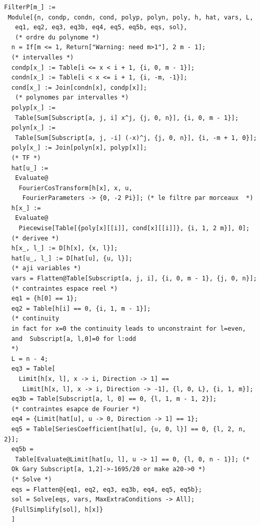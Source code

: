 \documentclass[11pt,twoside]{article}
\begin{document}
\begin{lstlisting}[language=iPython]
FilterP[m_] := 
 Module[{n, condp, condn, cond, polyp, polyn, poly, h, hat, vars, L, 
   eq1, eq2, eq3, eq3b, eq4, eq5, eq5b, eqs, sol},
   (* ordre du polynome *)
  n = If[m <= 1, Return["Warning: need m>1"], 2 m - 1];
  (* intervalles *)
  condp[x_] := Table[i <= x < i + 1, {i, 0, m - 1}];
  condn[x_] := Table[i < x <= i + 1, {i, -m, -1}];
  cond[x_] := Join[condn[x], condp[x]];
   (* polynomes par intervalles *)
  polyp[x_] := 
   Table[Sum[Subscript[a, j, i] x^j, {j, 0, n}], {i, 0, m - 1}];
  polyn[x_] := 
   Table[Sum[Subscript[a, j, -i] (-x)^j, {j, 0, n}], {i, -m + 1, 0}];
  poly[x_] := Join[polyn[x], polyp[x]];
  (* TF *)
  hat[u_] := 
   Evaluate@
    FourierCosTransform[h[x], x, u, 
     FourierParameters -> {0, -2 Pi}]; (* le filtre par morceaux  *)
  h[x_] := 
   Evaluate@
    Piecewise[Table[{poly[x][[i]], cond[x][[i]]}, {i, 1, 2 m}], 0];
  (* derivee *)
  h[x_, l_] := D[h[x], {x, l}];
  hat[u_, l_] := D[hat[u], {u, l}];
  (* aji variables *)
  vars = Flatten@Table[Subscript[a, j, i], {i, 0, m - 1}, {j, 0, n}];
  (* contraintes espace reel *)
  eq1 = {h[0] == 1};
  eq2 = Table[h[i] == 0, {i, 1, m - 1}];
  (* continuity
  in fact for x=0 the continuity leads to unconstraint for l=even, 
  and  Subscript[a, l,0]=0 for l:odd
  *)
  L = n - 4;
  eq3 = Table[
    Limit[h[x, l], x -> i, Direction -> 1] == 
     Limit[h[x, l], x -> i, Direction -> -1], {l, 0, L}, {i, 1, m}];
  eq3b = Table[Subscript[a, l, 0] == 0, {l, 1, m - 1, 2}];
  (* contraintes esapce de Fourier *)
  eq4 = {Limit[hat[u], u -> 0, Direction -> 1] == 1};
  eq5 = Table[SeriesCoefficient[hat[u], {u, 0, l}] == 0, {l, 2, n, 2}];
  eq5b = 
   Table[Evaluate@Limit[hat[u, l], u -> 1] == 0, {l, 0, n - 1}]; (* 
  Ok Gary Subscript[a, 1,2]->-1695/20 or make a20->0 *)
  (* Solve *)
  eqs = Flatten@{eq1, eq2, eq3, eq3b, eq4, eq5, eq5b};
  sol = Solve[eqs, vars, MaxExtraConditions -> All];
  {FullSimplify[sol], h[x]}
  ]
\end{lstlisting}
\end{document}
